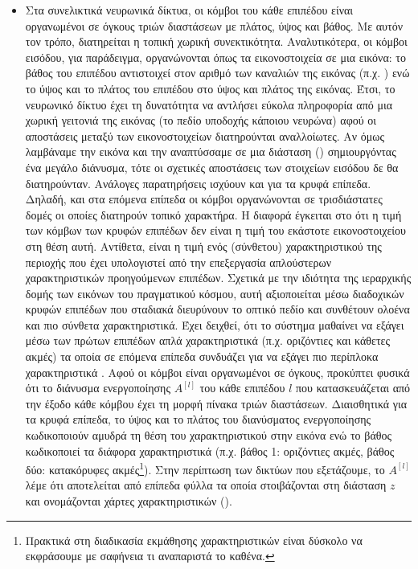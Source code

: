 \begin{itemize}
  \item Στα συνελικτικά νευρωνικά δίκτυα, οι κόμβοι του κάθε επιπέδου είναι οργανωμένοι σε όγκους τριών διαστάσεων με πλάτος, ύψος και βάθος. Με αυτόν τον τρόπο, διατηρείται η τοπική χωρική συνεκτικότητα. Αναλυτικότερα, οι κόμβοι εισόδου, για παράδειγμα, οργανώνονται όπως τα εικονοστοιχεία σε μια εικόνα: το βάθος του επιπέδου αντιστοιχεί στον αριθμό των καναλιών της εικόνας (π.χ. ) ενώ το ύψος και το πλάτος του επιπέδου στο ύψος και πλάτος της εικόνας. Έτσι, το νευρωνικό δίκτυο έχει τη δυνατότητα να αντλήσει εύκολα πληροφορία από μια χωρική γειτονιά της εικόνας (το πεδίο υποδοχής κάποιου νευρώνα) αφού οι αποστάσεις μεταξύ των εικονοστοιχείων διατηρούνται αναλλοίωτες. Αν όμως λαμβάναμε την εικόνα και την αναπτύσσαμε σε μια διάσταση () σημιουργόντας ένα μεγάλο διάνυσμα, τότε οι σχετικές αποστάσεις των στοιχείων εισόδου δε θα διατηρούνταν. Ανάλογες παρατηρήσεις ισχύουν και για τα κρυφά επίπεδα. Δηλαδή, και στα επόμενα επίπεδα οι κόμβοι οργανώνονται σε τρισδιάστατες δομές οι οποίες διατηρούν τοπικό χαρακτήρα. Η διαφορά έγκειται στο ότι η τιμή των κόμβων των κρυφών επιπέδων δεν είναι η τιμή του εκάστοτε εικονοστοιχείου στη θέση αυτή. Αντίθετα, είναι η τιμή ενός (σύνθετου) χαρακτηριστικού της περιοχής που έχει υπολογιστεί από την επεξεργασία απλούστερων χαρακτηριστικών προηγούμενων επιπέδων. Σχετικά με την ιδιότητα της ιεραρχικής δομής των εικόνων του πραγματικού κόσμου, αυτή αξιοποιείται μέσω διαδοχικών κρυφών επιπέδων που σταδιακά διευρύνουν το οπτικό πεδίο και συνθέτουν ολοένα και πιο σύνθετα χαρακτηριστικά. Έχει δειχθεί, ότι το σύστημα μαθαίνει να εξάγει μέσω των πρώτων επιπέδων απλά χαρακτηριστικά (π.χ. οριζόντιες και κάθετες ακμές) τα οποία σε επόμενα επίπεδα συνδυάζει για να εξάγει πιο περίπλοκα χαρακτηριστικά \cite{zeiler2014visualizing}. Αφού οι κόμβοι είναι οργανωμένοι σε όγκους, προκύπτει φυσικά ότι το διάνυσμα ενεργοποίησης $A^{[l]}$ του κάθε επιπέδου $l$ που κατασκευάζεται από την έξοδο κάθε κόμβου έχει τη μορφή πίνακα τριών διαστάσεων. Διαισθητικά για τα κρυφά επίπεδα, το ύψος και το πλάτος του διανύσματος ενεργοποίησης κωδικοποιούν αμυδρά τη θέση του χαρακτηριστικού στην εικόνα ενώ το βάθος κωδικοποιεί τα διάφορα χαρακτηριστικά (π.χ. βάθος 1: οριζόντιες ακμές, βάθος δύο: κατακόρυφες ακμές\footnote{Πρακτικά στη διαδικασία εκμάθησης χαρακτηριστικών είναι δύσκολο να εκφράσουμε με σαφήνεια τι αναπαριστά το καθένα.}). Στην περίπτωση των δικτύων που εξετάζουμε, το $A^{[l]}$ λέμε ότι αποτελείται από επίπεδα φύλλα τα οποία στοιβάζονται στη διάσταση $z$ και ονομάζονται χάρτες χαρακτηριστικών ().
  

\end{itemize}

